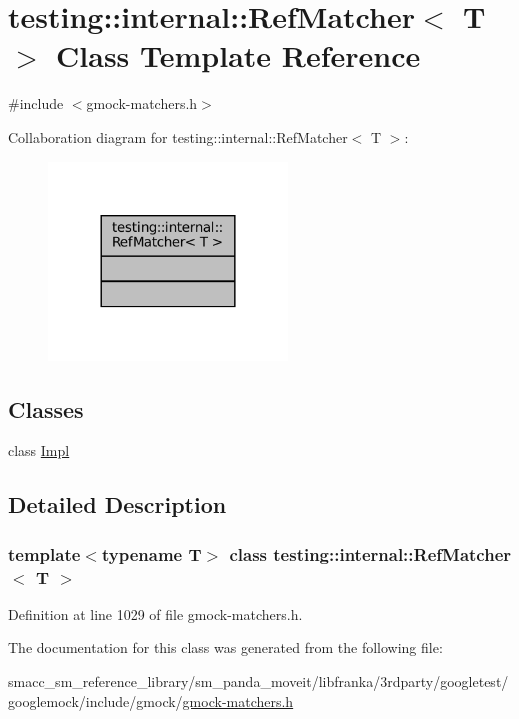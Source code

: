 \hypertarget{classtesting_1_1internal_1_1RefMatcher}{}\section{testing\+:\+:internal\+:\+:Ref\+Matcher$<$ T $>$ Class Template Reference}
\label{classtesting_1_1internal_1_1RefMatcher}


{\ttfamily \#include $<$gmock-\/matchers.\+h$>$}



Collaboration diagram for testing\+:\+:internal\+:\+:Ref\+Matcher$<$ T $>$\+:
\nopagebreak
\begin{figure}[H]
\begin{center}
\leavevmode
\includegraphics[width=180pt]{classtesting_1_1internal_1_1RefMatcher__coll__graph}
\end{center}
\end{figure}
\subsection*{Classes}
\begin{DoxyCompactItemize}
\item 
class \hyperlink{classtesting_1_1internal_1_1RefMatcher_3_01T_01_6_01_4_1_1Impl}{Impl}
\end{DoxyCompactItemize}


\subsection{Detailed Description}
\subsubsection*{template$<$typename T$>$\newline
class testing\+::internal\+::\+Ref\+Matcher$<$ T $>$}



Definition at line 1029 of file gmock-\/matchers.\+h.



The documentation for this class was generated from the following file\+:\begin{DoxyCompactItemize}
\item 
smacc\+\_\+sm\+\_\+reference\+\_\+library/sm\+\_\+panda\+\_\+moveit/libfranka/3rdparty/googletest/googlemock/include/gmock/\hyperlink{gmock-matchers_8h}{gmock-\/matchers.\+h}\end{DoxyCompactItemize}
